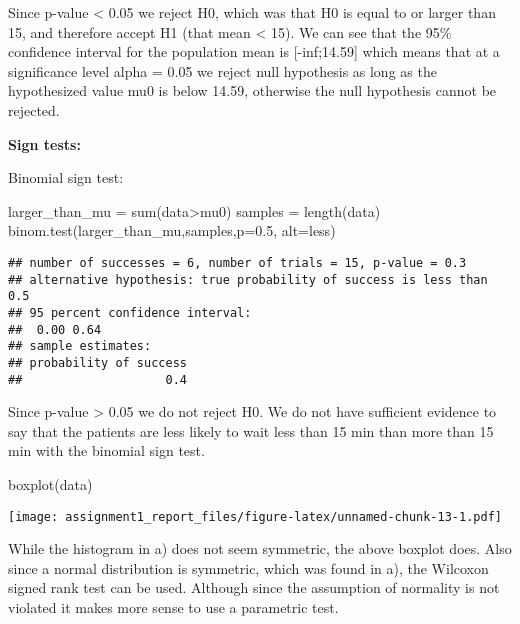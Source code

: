 \documentclass[
]{article}
\newenvironment{Shaded}{\begin{snugshade}}{\end{snugshade}}
\newcommand{\AttributeTok}[1]{\textcolor[rgb]{0.77,0.63,0.00}{#1}}
\newcommand{\FloatTok}[1]{\textcolor[rgb]{0.00,0.00,0.81}{#1}}
\newcommand{\FunctionTok}[1]{\textcolor[rgb]{0.00,0.00,0.00}{#1}}
\newcommand{\NormalTok}[1]{#1}
\newcommand{\OtherTok}[1]{\textcolor[rgb]{0.56,0.35,0.01}{#1}}
\newcommand{\SpecialCharTok}[1]{\textcolor[rgb]{0.00,0.00,0.00}{#1}}
\newcommand{\StringTok}[1]{\textcolor[rgb]{0.31,0.60,0.02}{#1}}
\begin{document}
Since p-value \textless{} 0.05 we reject H0, which was that H0 is equal
to or larger than 15, and therefore accept H1 (that mean \textless{}
15). We can see that the 95\% confidence interval for the population
mean is {[}-inf;14.59{]} which means that at a significance level alpha
= 0.05 we reject null hypothesis as long as the hypothesized value mu0
is below 14.59, otherwise the null hypothesis cannot be rejected.

\textbf{Sign tests:}

Binomial sign test:

\begin{Shaded}
\begin{Highlighting}[]
\NormalTok{larger\_than\_mu }\OtherTok{=} \FunctionTok{sum}\NormalTok{(data}\SpecialCharTok{\textgreater{}}\NormalTok{mu0)}
\NormalTok{samples }\OtherTok{=} \FunctionTok{length}\NormalTok{(data)}
\FunctionTok{binom.test}\NormalTok{(larger\_than\_mu,samples,}\AttributeTok{p=}\FloatTok{0.5}\NormalTok{, }\AttributeTok{alt=}\StringTok{\textquotesingle{}less\textquotesingle{}}\NormalTok{)}
\end{Highlighting}
\end{Shaded}

\begin{verbatim}
## number of successes = 6, number of trials = 15, p-value = 0.3
## alternative hypothesis: true probability of success is less than 0.5
## 95 percent confidence interval:
##  0.00 0.64
## sample estimates:
## probability of success 
##                    0.4
\end{verbatim}

Since p-value \textgreater{} 0.05 we do not reject H0. We do not have
sufficient evidence to say that the patients are less likely to wait
less than 15 min than more than 15 min with the binomial sign test.

\begin{Shaded}
\begin{Highlighting}[]
\FunctionTok{boxplot}\NormalTok{(data)}
\end{Highlighting}
\end{Shaded}

\texttt{[image: assignment1\_report\_files/figure-latex/unnamed-chunk-13-1.pdf]}

While the histogram in a) does not seem symmetric, the above boxplot
does. Also since a normal distribution is symmetric, which was found in
a), the Wilcoxon signed rank test can be used. Although since the
assumption of normality is not violated it makes more sense to use a
parametric test.
\end{document}
